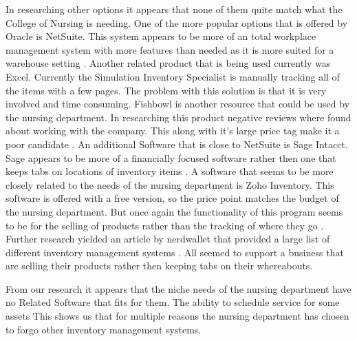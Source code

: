 

In researching other options it appears that none of them quite match what the College of Nursing is needing. One of the more popular options that is offered by Oracle is NetSuite. This system appears to be more of an total workplace management system with more features than needed as it is more suited for a warehouse setting \cite{costello_2021}. Another related product that is being used currently was Excel. Currently the Simulation Inventory Specialist is manually tracking all of the items with a few pages. The problem with this solution is that it is very involved and time consuming. Fishbowl is another resource that could be used by the nursing department. In researching this product negative reviews where found about working with the company. This along with it's large price tag make it a poor candidate \cite{g2}. An additional Software that is close to NetSuite is Sage Intacct. Sage appears to be more of a financially focused software rather then one that keeps tabs on locations of inventory items \cite{capterra}. A software that seems to be more closely related to the needs of the nursing department is Zoho Inventory. This software is offered with a free version, so the price point matches the budget of the nursing department. But once again the functionality of this program seems to be for the selling of products rather than the tracking of where they go \cite{inventory}. Further research yielded an article by nerdwallet that provided a large list of different inventory management systems \cite{wood_2021}. All seemed to support a business that are selling their products rather then keeping tabs on their whereabouts.

From our research it appears that the niche needs of the nursing department have no Related Software that fits for them. The ability to schedule service for some assets  This shows us that for multiple reasons the nursing department has chosen to forgo other inventory management systems. 